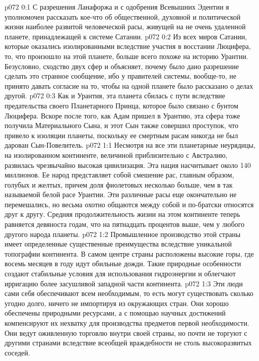 \author{Мелхиседек}
\vs p072 0:1 С разрешения Ланафоржа и с одобрения Всевышних Эдентии я уполномочен рассказать кое\hyp{}что об общественной, духовной и политической жизни наиболее развитой человеческой расы, живущей на не очень удаленной планете, принадлежащей к системе Сатании.
\vs p072 0:2 Из всех миров Сатании, которые оказались изолированными вследствие участия в восстании Люцифера, то, что произошло на этой планете, больше всего похоже на историю Урантии. Безусловно, сходство двух сфер и объясняет, почему было дано разрешение сделать это странное сообщение, ибо у правителей системы, вообще\hyp{}то, не принято давать согласие на то, чтобы на одной планете было рассказано о делах другой.
\vs p072 0:3 Как и Урантия, эта планета сбилась с пути вследствие предательства своего Планетарного Принца, которое было связано с бунтом Люцифера. Вскоре после того, как Адам пришел в Урантию, эта сфера тоже получила Материального Сына, и этот Сын также совершил проступок, что привело к изоляции планеты, поскольку ее смертным расам никогда не был дарован Сын\hyp{}Повелитель.
\vs p072 1:1 Несмотря на все эти планетарные неурядицы, на изолированном континенте, величиной приблизительно с Австралию, развилась чрезвычайно высокая цивилизация. Эта нация насчитывает около 140 миллионов. Ее народ представляет собой смешение рас, главным образом, голубых и желтых, причем доля фиолетовых несколько больше, чем в так называемой белой расе Урантии. Эти различные расы еще окончательно не перемешались, но весьма охотно общаются между собой и по\hyp{}братски относятся друг к другу. Средняя продолжительность жизни на этом континенте теперь равняется девяноста годам, что на пятнадцать процентов выше, чем у любого другого народа планеты.
\vs p072 1:2 Промышленное производство этой страны имеет определенные существенные преимущества вследствие уникальной топографии континента. В самом центре страны расположены высокие горы, где восемь месяцев в году идут обильные дожди. Такие природные особенности создают стабильные условия для использования гидроэнергии и облегчают ирригацию более засушливой западной части континента.
\vs p072 1:3 Эти люди сами себя обеспечивают всем необходимым, то есть могут существовать сколько угодно долго, ничего не импортируя из окружающих стран. Они хорошо обеспечены природными ресурсами, а с помощью научных достижений компенсируют их нехватку для производства предметов первой необходимости. Они ведут оживленную торговлю внутри своей страны, но почти не торгуют с другими странами вследствие всеобщей враждебности не столь высокоразвитых соседей.
